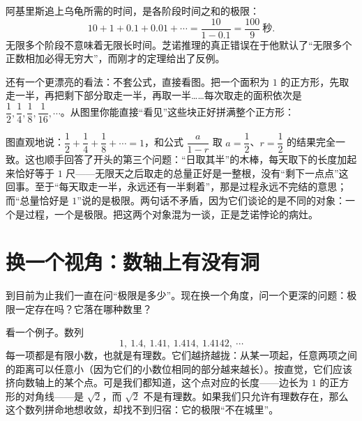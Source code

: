 \begin{tuilun}[芝诺悖论的解决]
阿基里斯追上乌龟所需的时间，是各阶段时间之和的极限：
\[
10+1+0.1+0.01+\cdots=\frac{10}{1-0.1}=\frac{100}{9}\ \text{秒}.
\]
无限多个阶段不意味着无限长时间。芝诺推理的真正错误在于他默认了“无限多个正数相加必得无穷大”，而刚才的定理给出了反例。
\end{tuilun}

还有一个更漂亮的看法：不套公式，直接看图。把一个面积为 $1$ 的正方形，先取走一半，再把剩下部分取走一半，再取一半……每次取走的面积依次是 $\dfrac{1}{2},\dfrac{1}{4},\dfrac{1}{8},\dfrac{1}{16},\cdots$。从图里你能直接“看见”这些块正好拼满整个正方形：

\begin{center}
\end{center}

图直观地说：$\dfrac{1}{2}+\dfrac{1}{4}+\dfrac{1}{8}+\cdots=1$，和公式 $\dfrac{a}{1-r}$ 取 $a=\dfrac{1}{2}$、$r=\dfrac{1}{2}$ 的结果完全一致。这也顺手回答了开头的第三个问题：“日取其半”的木棒，每天取下的长度加起来恰好等于 $1$ 尺——无限天之后取走的总量正好是一整根，没有“剩下一点点”这回事。至于“每天取走一半，永远还有一半剩着”，那是过程永远不完结的意思；而“总量恰好是 $1$”说的是极限。两句话不矛盾，因为它们谈论的是不同的对象：一个是过程，一个是极限。把这两个对象混为一谈，正是芝诺悖论的病灶。

\section{换一个视角：数轴上有没有洞}

到目前为止我们一直在问“极限是多少”。现在换一个角度，问一个更深的问题：极限一定存在吗？它落在哪种数里？

看一个例子。数列
\[
1,\ 1.4,\ 1.41,\ 1.414,\ 1.4142,\ \cdots
\]
每一项都是有限小数，也就是有理数。它们越挤越拢：从某一项起，任意两项之间的距离可以任意小（因为它们的小数位相同的部分越来越长）。按直觉，它们应该挤向数轴上的某个点。可是我们都知道，这个点对应的长度——边长为 $1$ 的正方形的对角线——是 $\sqrt{2}$，而 $\sqrt{2}$ 不是有理数。如果我们只允许有理数存在，那么这个数列拼命地想收敛，却找不到归宿：它的极限“不在城里”。


